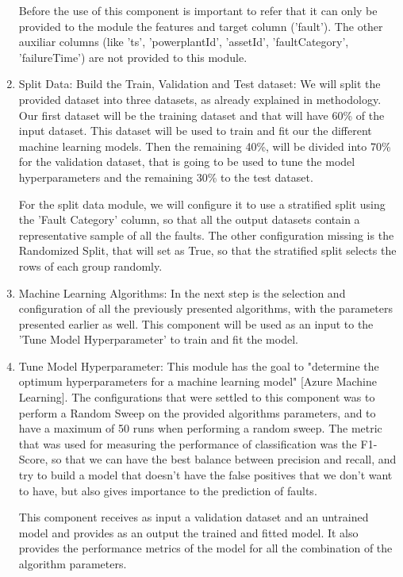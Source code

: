 \begin{enumerate}
Before the use of this component is important to refer that it can only be provided to the module the features and target column ('fault'). The other auxiliar columns (like 'ts', 'powerplantId', 'assetId', 'faultCategory', 'failureTime') are not provided to this module.

    \item{Split Data: Build the Train, Validation and Test dataset:}
We will split the provided dataset into three datasets, as already explained in methodology. Our first dataset will be the training dataset and that will have 60\% of the input dataset. This dataset will be used to train and fit our the different machine learning models. Then the remaining 40\%, will be divided into 70\% for the validation dataset, that is going to be used to tune the model hyperparameters and the remaining 30\% to the test dataset.

For the split data module, we will configure it to use a stratified split using the 'Fault Category' column, so that all the output datasets contain a representative sample of all the faults. The other configuration missing is the Randomized Split, that will set as True, so that the stratified split selects the rows of each group randomly.

    \item{Machine Learning Algorithms:}
In the next step is the selection and configuration of all the previously presented algorithms, with the parameters presented earlier as well. This component will be used as an input to the 'Tune Model Hyperparameter' to train and fit the model.

    \item{Tune Model Hyperparameter:}
This module has the goal to "determine the optimum hyperparameters for a machine learning model" [Azure Machine Learning]. The configurations that were settled to this component was to perform a Random Sweep on the provided algorithms parameters, and to have a maximum of 50 runs when performing a random sweep. The metric that was used for measuring the performance of classification was the F1-Score, so that we can have the best balance between precision and recall, and try to build a model that doesn't have the false positives that we don't want to have, but also gives importance to the prediction of faults.

This component receives as input a validation dataset and an untrained model and provides as an output the trained and fitted model. It also provides the performance metrics of the model for all the combination of the algorithm parameters.


\end{enumerate}
